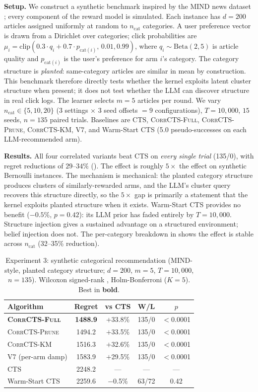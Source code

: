 \documentclass{article}
\theoremstyle{plain}
\theoremstyle{definition}
\theoremstyle{remark}
\newcommand{\CorrFull}{\textsc{CorrCTS-Full}}
\newcommand{\EdgePrune}{\textsc{CorrCTS-Prune}}
\newcommand{\KMRefine}{\textsc{CorrCTS-KM}}
\begin{document}
\textbf{Setup.}
We construct a synthetic benchmark inspired by the MIND news dataset \citep{wu2020mind}; every component of the reward model is simulated.
Each instance has $d = 200$ articles assigned uniformly at random to $n_\text{cat}$ categories.
A user preference vector is drawn from a Dirichlet over categories; click probabilities are $\mu_i = \text{clip}(0.3 \cdot q_i + 0.7 \cdot p_{\text{cat}(i)},\, 0.01, 0.99)$, where $q_i \sim \text{Beta}(2,5)$ is article quality and $p_{\text{cat}(i)}$ is the user's preference for arm $i$'s category.
The category structure is \emph{planted}: same-category articles are similar in mean by construction.
This benchmark therefore directly tests whether the kernel exploits latent cluster structure when present; it does not test whether the LLM can discover structure in real click logs.
The learner selects $m = 5$ articles per round.
We vary $n_\text{cat} \in \{5, 10, 20\}$ (3 settings $\times$ 3 seed offsets $= 9$ configurations), $T = 10{,}000$, $15$ seeds, $n = 135$ paired trials.
Baselines are CTS, \CorrFull{}, \EdgePrune{}, \KMRefine{}, V7, and Warm-Start CTS (5.0 pseudo-successes on each LLM-recommended arm).

\textbf{Results.}
All four correlated variants beat CTS on \emph{every single trial} (135/0), with regret reductions of $29$--$34\%$ ().
The effect is roughly $5\times$ the effect on synthetic Bernoulli instances.
The mechanism is mechanical: the planted category structure produces clusters of similarly-rewarded arms, and the LLM's cluster query recovers this structure directly, so the $5\times$ gap is primarily a statement that the kernel exploits planted structure when it exists.
Warm-Start CTS provides no benefit ($-0.5\%$, $p = 0.42$): its LLM prior has faded entirely by $T = 10{,}000$.
Structure injection gives a sustained advantage on a structured environment; belief injection does not.
The per-category breakdown in  shows the effect is stable across $n_\text{cat}$ (32--35\% reduction).

\begin{table}[t]
\caption{Experiment 3: synthetic categorical recommendation (MIND-style, planted category structure; $d{=}200$, $m{=}5$, $T{=}10{,}000$, $n{=}135$). Wilcoxon signed-rank \citep{wilcoxon1945individual}, Holm-Bonferroni \citep{holm1979simple} ($K{=}5$). Best in \textbf{bold}.}
\label{tab:mind}
\centering
\small
\begin{tabular}{@{}lcccc@{}}
\toprule
Algorithm & Regret & vs CTS & W/L & $p$ \\
\midrule
\textbf{\CorrFull{}} & \textbf{1488.9} & $+$33.8\% & 135/0 & ${<}$0.0001 \\
\EdgePrune{} & 1494.2 & $+$33.5\% & 135/0 & ${<}$0.0001 \\
\KMRefine{} & 1516.3 & $+$32.6\% & 135/0 & ${<}$0.0001 \\
V7 (per-arm damp) & 1583.9 & $+$29.5\% & 135/0 & ${<}$0.0001 \\
CTS & 2248.2 & --- & --- & --- \\
Warm-Start CTS & 2259.6 & $-$0.5\% & 63/72 & 0.42 \\
\bottomrule
\end{tabular}
\end{table}
\end{document}
